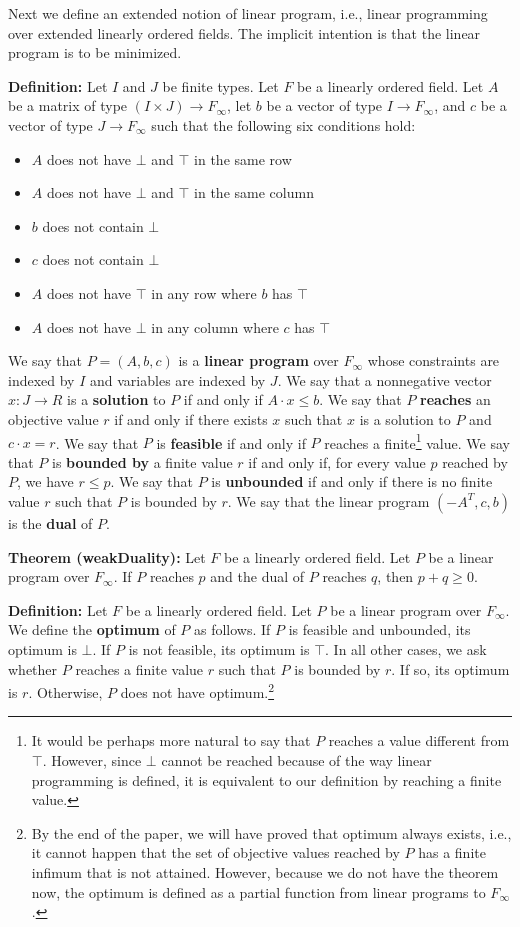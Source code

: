 \documentclass[]{article}
\renewcommand{\.}{\hskip .75pt}
\let\r=\rightarrow
\let\*=\cdot
\begin{document}
Next we define an extended notion of linear program, i.e.,
linear programming over extended linearly ordered fields.
The implicit intention is that the linear program is to be minimized.

\medskip \noindent
\textbf{Definition:}
Let $I$ and $J$ be finite types.
Let $F$ be a linearly ordered field.
Let $A$ be a matrix of type $(I \times J) \r F_\infty$,
let $b$ be a vector of type $I \r F_\infty$,
and $c$ be a vector of type $J \r F_\infty$
such that the following six conditions hold:
\begin{itemize}
\item $A$ does not have $\bot$ and $\top$ in the same row
\item $A$ does not have $\bot$ and $\top$ in the same column
\item $b$ does not contain $\bot$
\item $c$ does not contain $\bot$
\item $A$ does not have $\top$ in any row where $b$ has $\top$
\item $A$ does not have $\bot$ in any column where $c$ has $\top$
\end{itemize}
We say that $P = (A, b, c)$ is a \textbf{linear program} over $F_\infty$
whose constraints are indexed by $I$ and variables are indexed by $J$.
We say that a nonnegative vector $x : J \r R$ is
a \textbf{solution} to $P$ if and only if $A \* x \le b$.
We say that $P$ \textbf{reaches} an objective value $r$
if and only if there exists $x$ such that $x$ is a solution to $P$
and $c \* x = r$.
We say that $P$ is \textbf{feasible} if and only if $P$ reaches a finite\footnote{
It would be perhaps more natural to say that $P$ reaches a value different
from $\top$. However, since $\bot$ cannot be reached because of the way
linear programming is defined, it is equivalent to our definition by
reaching a finite value.} value.
We say that $P$ is \textbf{bounded by} a finite value $r$ if and only if,
for every value $p$ reached by $P$, we have $r \le p$.
We say that $P$ is \textbf{unbounded} if and only if there is no finite value $r$
such that $P$ is bounded by $r$.
We say that the linear program $(-A^T, c, b)$ is the \textbf{dual} of $P$.

\medskip \noindent
\textbf{Theorem (weakDuality):}
Let $F$ be a linearly ordered field.
Let $P$ be a linear program over $F_\infty$.
If $P$ reaches $p$ and the dual of $P$ reaches $q$,
then $p + q \ge 0$.

\medskip \noindent
\textbf{Definition:}
Let $F$ be a linearly ordered field.
Let $P$ be a linear program over $F_\infty$.
We define the \textbf{optimum} of $P$ as follows.
If $P$ is feasible and unbounded, its optimum is $\bot$.
If $P$ is not feasible, its optimum is $\top$.
In all other cases, we ask whether $P$ reaches a finite value $r$ such that
$P$ is bounded by $r$. If so, its optimum is $r$.
Otherwise, $P$ does not have optimum.\footnote{By the end of the paper, we will
have proved that optimum always exists, i.e., it cannot happen that the set of
objective values reached by $P$ has a finite infimum that is not attained.
However, because we do not have the theorem now, the optimum is defined as a partial function
from linear programs to $F_\infty$.}
\end{document}
